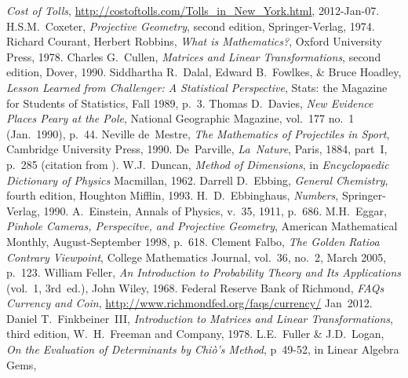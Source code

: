 \begin{thebibliography}{\makebox[2em][c]{{}\hfil{}}}
  \emph{Cost of Tolls},
  \url{http://costoftolls.com/Tolls_in_New_York.html},
  2012-Jan-07.
  H.S.M.~Coxeter,
  \emph{Projective Geometry},
  second edition,
  Springer-Verlag, 1974.
  Richard Courant, Herbert Robbins,
  \emph{What is Mathematics?},
  Oxford University Press, 1978.
  Charles G.\ Cullen,
  \emph{Matrices and Linear Transformations},
  second edition,
  Dover,
  1990.
  Siddhartha R.~Dalal, Edward B.~Fowlkes, \& Bruce Hoadley,
  \emph{Lesson Learned from Challenger: A Statistical Perspective},
  Stats: the Magazine for Students of Statistics,
  Fall 1989,
  p.~3.
  Thomas D.~Davies,
  \emph{New Evidence Places Peary at the Pole},
  National Geographic Magazine,
  vol.~177 no.~1 (Jan.~1990),
  p.~44.
  Neville de~Mestre,
  \emph{The Mathematics of Projectiles in Sport},
  Cambridge University Press,
  1990.
 De~Parville,
 \emph{La~Nature},
 Paris, 1884,
 part~I,
 p.~285
 (citation from \cite{Ball}).
  W.J.~Duncan,
  \emph{Method of Dimensions},
  in
  \emph{Encyclopaedic Dictionary of Physics}
  Macmillan,
  1962.
  Darrell D.~Ebbing,
  \emph{General Chemistry},
  fourth edition,
  Houghton Mifflin,
  1993.
  H.\ D.\ Ebbinghaus,
  \emph{Numbers},
  Springer-Verlag,
  1990.
  A.~Einstein,
  Annals of Physics,
  v.~35, 1911,
  p.~686.
  M.H.~Eggar,
  \emph{Pinhole Cameras, Perspecitve, and Projective Geometry},
  American Mathematical Monthly,
  August-September 1998,
  p.~618.
  Clement Falbo,
  \emph{The Golden Ratio\Dash a Contrary Viewpoint},
  College Mathematics Journal,
  vol.~36, no.~2, March 2005,
  p.~123.
  William Feller,
  \emph{An Introduction to Probability Theory and Its Applications}
  (vol.~1, 3rd~ed.),
  John Wiley, 1968.
  Federal Reserve Bank of Richmond,
  \emph{FAQs Currency and Coin},
  \url{http://www.richmondfed.org/faqs/currency/}
  Jan~2012.
  Daniel T.\ Finkbeiner~III,
  \emph{Introduction to Matrices and Linear Transformations},
  third edition,
  W.\ H.\ Freeman and Company,
  1978.
  L.E.~Fuller \& J.D.~Logan,
  \emph{On the Evaluation of Determinants by Chi\`o's Method},
  p~49-52, in Linear Algebra Gems,

\end{thebibliography}
